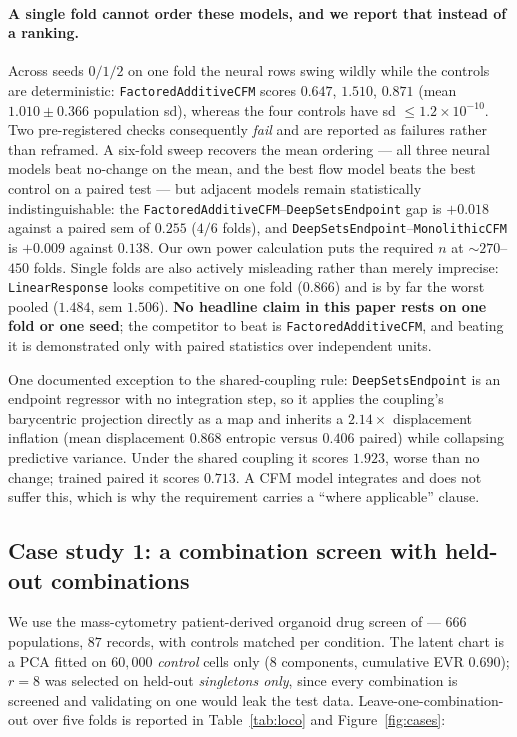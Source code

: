 \documentclass{article}
\begin{document}
\paragraph{A single fold cannot order these models, and we report that instead of a ranking.}
Across seeds $0/1/2$ on one fold the neural rows swing wildly while the controls are
deterministic: \texttt{FactoredAdditiveCFM} scores $0.647$, $1.510$, $0.871$
(mean $1.010 \pm 0.366$ population sd), whereas the four controls have sd $\le 1.2\times10^{-10}$.
Two pre-registered checks consequently \emph{fail} and are reported as failures rather than
reframed. A six-fold sweep recovers the mean ordering --- all three neural models beat
no-change on the mean, and the best flow model beats the best control on a paired test ---
but adjacent models remain statistically indistinguishable: the
\texttt{FactoredAdditiveCFM}--\texttt{DeepSetsEndpoint} gap is $+0.018$ against a paired sem
of $0.255$ ($4/6$ folds), and \texttt{DeepSetsEndpoint}--\texttt{MonolithicCFM} is $+0.009$
against $0.138$. Our own power calculation puts the required $n$ at $\sim\!270$--$450$
folds. Single folds are also actively misleading rather than merely imprecise:
\texttt{LinearResponse} looks competitive on one fold ($0.866$) and is by far the worst
pooled ($1.484$, sem $1.506$). \textbf{No headline claim in this paper rests on one fold or
one seed}; the competitor to beat is \texttt{FactoredAdditiveCFM}, and beating it is
demonstrated only with paired statistics over independent units.

One documented exception to the shared-coupling rule: \texttt{DeepSetsEndpoint} is an
endpoint regressor with no integration step, so it applies the coupling's barycentric
projection directly as a map and inherits a $2.14\times$ displacement inflation (mean
displacement $0.868$ entropic versus $0.406$ paired) while collapsing predictive variance.
Under the shared coupling it scores $1.923$, worse than no change; trained paired it scores
$0.713$. A CFM model integrates and does not suffer this, which is why the requirement
carries a ``where applicable'' clause.

\subsection{Case study 1: a combination screen with held-out combinations}

We use the mass-cytometry patient-derived organoid drug screen of
\citet{ramoszapatero2023trellis} --- $666$ populations, $87$ records, with controls matched
per condition. The latent chart is a PCA fitted on $60{,}000$ \emph{control} cells only ($8$
components, cumulative EVR $0.690$); $r{=}8$ was selected on held-out \emph{singletons only},
since every combination is screened and validating on one would leak the test data.
Leave-one-combination-out over five folds is reported in Table~\ref{tab:loco} and
Figure~\ref{fig:cases}:
\end{document}

